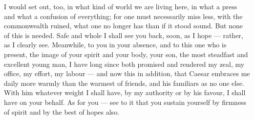  I would set out, too, in what kind of world we are living here, in what a press and what a confusion of everything; for one must necessarily miss less, with the commonwealth ruined, what one no longer has than if it stood sound. But none of this is needed. Safe and whole I shall see you back, soon, as I hope --- rather, as I clearly see. Meanwhile, to you in your absence, and to this one who is present, the image of your spirit and your body, your son, the most steadfast and excellent young man, I have long since both promised and rendered my zeal, my office, my effort, my labour --- and now this in addition, that Caesar embraces me daily more warmly than the warmest of friends, and his familiars as no one else. With him whatever weight I shall have, by my authority or by his favour, I shall have on your behalf. As for you --- see to it that you sustain yourself by firmness of spirit and by the best of hopes also.
